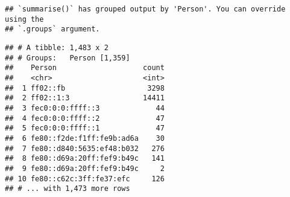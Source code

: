 \documentclass[
]{article}
\newenvironment{Shaded}{\begin{snugshade}}{\end{snugshade}}
\newcommand{\AttributeTok}[1]{\textcolor[rgb]{0.77,0.63,0.00}{#1}}
\newcommand{\ConstantTok}[1]{\textcolor[rgb]{0.00,0.00,0.00}{#1}}
\newcommand{\FunctionTok}[1]{\textcolor[rgb]{0.00,0.00,0.00}{#1}}
\newcommand{\NormalTok}[1]{#1}
\newcommand{\OtherTok}[1]{\textcolor[rgb]{0.56,0.35,0.01}{#1}}
\newcommand{\SpecialCharTok}[1]{\textcolor[rgb]{0.00,0.00,0.00}{#1}}
\newcommand{\StringTok}[1]{\textcolor[rgb]{0.31,0.60,0.02}{#1}}
\begin{document}
\begin{Shaded}
\end{Shaded}

\begin{verbatim}
## `summarise()` has grouped output by 'Person'. You can override using the
## `.groups` argument.
\end{verbatim}

\begin{Shaded}
\end{Shaded}

\begin{verbatim}
## # A tibble: 1,483 x 2
## # Groups:   Person [1,359]
##    Person                    count
##    <chr>                     <int>
##  1 ff02::fb                   3298
##  2 ff02::1:3                 14411
##  3 fec0:0:0:ffff::3             44
##  4 fec0:0:0:ffff::2             47
##  5 fec0:0:0:ffff::1             47
##  6 fe80::f2de:f1ff:fe9b:ad6a    30
##  7 fe80::d840:5635:ef48:b032   276
##  8 fe80::d69a:20ff:fef9:b49c   141
##  9 fe80::d69a:20ff:fef9:b49c     2
## 10 fe80::c62c:3ff:fe37:efc     126
## # ... with 1,473 more rows
\end{verbatim}
\end{document}
